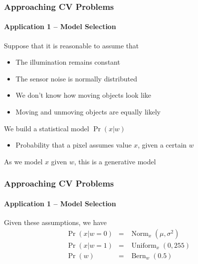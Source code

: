 \documentclass[xetex,professionalfont]{beamer}
\DeclareMathOperator*{\Norm}{Norm}
\DeclareMathOperator*{\Uniform}{Uniform}
\DeclareMathOperator*{\Bern}{Bern}
\renewcommand\emph[1]{\textcolor{tuwcvl_inf_red}{#1}}
\begin{document}

\begin{frame}
\frametitle{Approaching CV Problems}
\framesubtitle{Application 1 -- Model Selection}

Suppose that it is reasonable to assume that
\begin{itemize}
    \item The illumination remains constant %
    \item The sensor noise is normally distributed %
    \item We don't know how moving objects look like %
    \item Moving and unmoving objects are equally likely
\end{itemize}

\bigskip
We build a \emph{statistical model} $\Pr(x|w)$ %
\begin{itemize}
    \item Probability that a pixel assumes value $x$, given a certain $w$
\end{itemize}

\bigskip
As we model $x$ given $w$, this is a \emph{generative model}

\end{frame}


\begin{frame}
\frametitle{Approaching CV Problems}
\framesubtitle{Application 1 -- Model Selection}

Given these assumptions, we have %
\begin{eqnarray*}
    \Pr(x|w=0)&=&\Norm_{x}(\mu,\sigma^2)\\ %
    \Pr(x|w=1)&=&\Uniform_x(0, 255) \\ %
    \Pr(w)&=&\Bern_w(0.5) %
\end{eqnarray*}


\end{frame}
\end{document}
